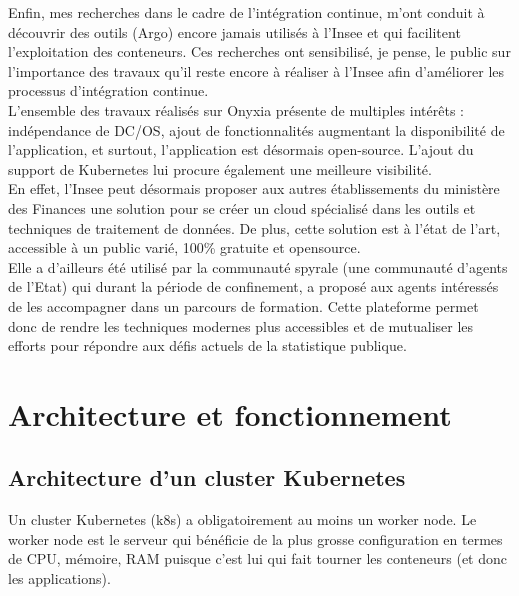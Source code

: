 \documentclass[11pt,fleqn]{book} %
\begin{document}
Enfin, mes recherches dans le cadre de l'intégration continue, m'ont conduit à découvrir des outils (Argo) encore jamais utilisés à l'Insee et qui facilitent l'exploitation des conteneurs. Ces recherches ont sensibilisé, je pense, le public sur l'importance des travaux qu'il reste encore à réaliser à l'Insee afin d'améliorer les processus d'intégration continue.\\

L'ensemble des travaux réalisés sur Onyxia présente de multiples intérêts : indépendance de DC/OS, ajout de fonctionnalités augmentant la disponibilité de l'application, et surtout, l'application est désormais open-source. L'ajout du support de Kubernetes lui procure également une meilleure visibilité.\\


En effet, l'Insee peut désormais proposer aux autres établissements du ministère des Finances une solution pour se créer un cloud spécialisé dans les outils et techniques de traitement de données. De plus, cette solution est à l’état de l’art, accessible à un public varié, 100\% gratuite et opensource.\\

Elle a d'ailleurs été utilisé par la communauté spyrale (une communauté d'agents de l'Etat) qui durant la période de confinement, a proposé aux agents intéressés de les accompagner dans un parcours de formation. Cette plateforme permet donc de rendre les techniques modernes plus accessibles et de mutualiser les efforts pour répondre aux défis actuels de la statistique publique.\\



\appendix


\chapter{Architecture et fonctionnement}
\vspace{-2cm}
\label{Architecture}

\section*{Architecture d'un cluster Kubernetes}
Un cluster Kubernetes (k8s) a obligatoirement au moins un worker node. Le worker node est le serveur qui bénéficie de la plus grosse configuration en termes de CPU, mémoire, RAM puisque c'est lui qui fait tourner les conteneurs (et donc les applications).\newline 
\end{document}
